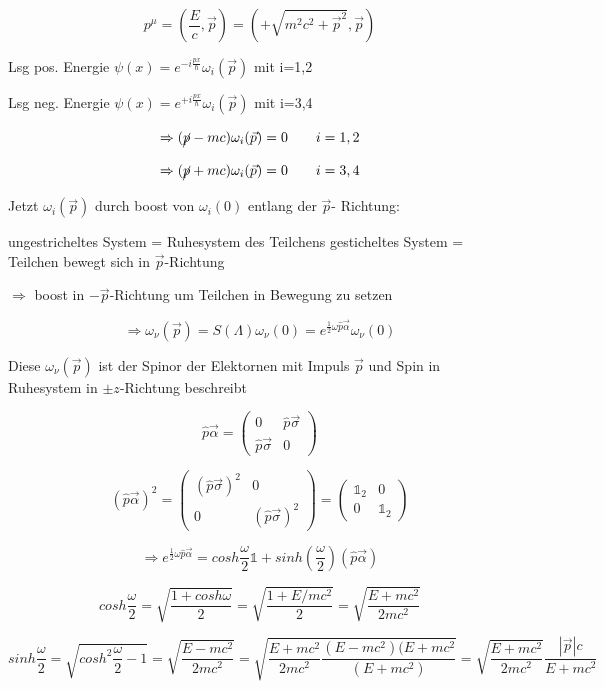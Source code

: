 \[p^\mu = (\frac{E}{c},\vec p) = (+\sqrt{m^2c^2+\vec p^2},\vec p)\]

Lsg pos. Energie \(\psi(x) = e^{-i\frac{px}{\hbar}}\omega_i(\vec p)\) mit i=1,2

Lsg neg. Energie \(\psi(x) = e^{+i\frac{px}{\hbar}}\omega_i(\vec p)\) mit i=3,4

\[\Rightarrow (\cancel p -mc) \omega_i(\vec p) = 0 \qquad i=1,2\]

\[\Rightarrow (\cancel p +mc) \omega_i(\vec p) = 0 \qquad i=3,4\]

Jetzt \(\omega_i(\vec p)\) durch boost von \(\omega_i(0)\) entlang der \(\vec p\)- Richtung:

ungestricheltes System = Ruhesystem des Teilchens
gesticheltes System = Teilchen bewegt sich in \(\vec p \)-Richtung

\(\Rightarrow \) boost in \(-\vec p\)-Richtung um Teilchen in Bewegung zu setzen

\[\Rightarrow \omega_\nu(\vec p) = S(\Lambda)\omega_\nu(0) = e^{\frac{1}{2}\omega\hat p\vec\alpha}\omega_\nu(0)  \]

Diese \(\omega_\nu(\vec p)\) ist der Spinor der Elektornen mit Impuls \(\vec p\) und Spin in Ruhesystem in \(\pm z\)-Richtung beschreibt

\[\hat p\vec \alpha = \begin{pmatrix} 0& \hat p\vec\sigma \\ \hat p\vec \sigma& 0 \end{pmatrix} \]

\[ (\hat p\vec \alpha)^2 = \begin{pmatrix} (\hat p\vec\sigma)^2&0 \\0& (\hat p\vec \sigma)^2 \end{pmatrix} =  \begin{pmatrix} \mathbb 1_2&0 \\0& \mathbb 1_2 \end{pmatrix}  \]

\[\Rightarrow e^{\frac{1}{2}\omega\hat p\vec\alpha} = cosh\frac{\omega}{2}\mathbb 1 + sinh(\frac{\omega}{2})(\hat p\vec \alpha)\]

\[cosh\frac{\omega}{2} = \sqrt{\frac{1+cosh\omega}{2}} = \sqrt{\frac{1+E/mc^2}{2}} =  \sqrt{\frac{E+mc^2}{2mc^2}} \]


\[sinh\frac{\omega}{2} = \sqrt{cosh^2\frac{\omega}{2}-1} =  \sqrt{\frac{E-mc^2}{2mc^2}} =  \sqrt{\frac{E+mc^2}{2mc^2} \frac{(E-mc^2)(E+mc^2}{(E+mc^2)} } = \sqrt{\frac{E+mc^2}{2mc^2}} \frac{|\vec p|c}{E+mc^2}   \]

